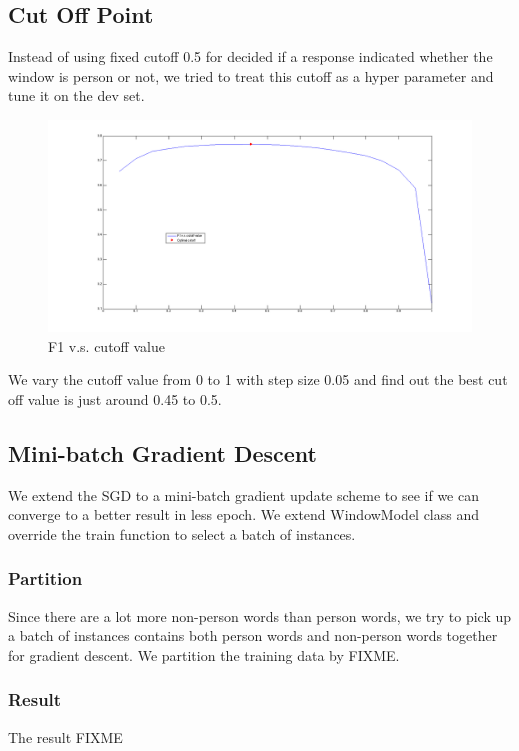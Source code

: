 \documentclass[letterpaper]{article}
\begin{document}
\subsection{Cut Off Point}
Instead of using fixed cutoff 0.5 for decided if a response indicated whether the window is person or not, we tried to treat this cutoff as a hyper parameter and tune it on the dev set.
\begin{figure}[ht]
\begin{center}
\includegraphics[scale=0.2]{f1.png}
\caption{F1 v.s. cutoff value}
\label{fig:cutoff}
\end{center}
\end{figure}
We vary the cutoff value from 0 to 1 with step size 0.05 and find out the best cut off value is just around 0.45 to 0.5.


\subsection{Mini-batch Gradient Descent}
We extend the SGD to a mini-batch gradient update scheme to see if we can converge to a better result in less epoch. We extend WindowModel class and override the train function to select a batch of instances.
\subsubsection{Partition}
Since there are a lot more non-person words than person words, we try to pick up a batch of instances contains both person words and non-person words together for gradient descent. We partition the training data by FIXME.
\subsubsection{Result}
The result FIXME
\end{document}
